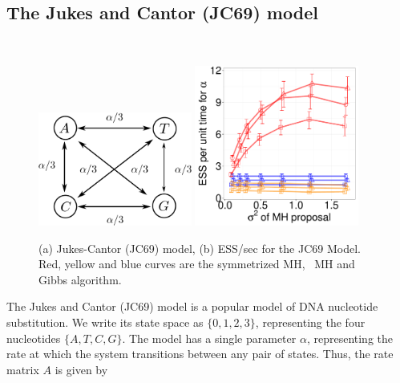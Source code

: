 {\vspace{-.23in}
  \subsection{The Jukes and Cantor (JC69) model}~
  \begin{figure}%
  \begin{minipage}[!hp]{0.75\linewidth}
    \includegraphics[width=0.45\textwidth, angle=0]{figs/jc_model.pdf}
    \includegraphics[width=0.48\textwidth, angle=0]{figs/jc.pdf}
  \end{minipage}
  \begin{minipage}[!hp]{0.23\linewidth}
  \caption{(a) Jukes-Cantor (JC69) model, (b)
    ESS/sec for the JC69 Model. Red, yellow and blue curves are the 
      symmetrized MH, \naive\ MH and Gibbs algorithm. }
     \label{fig:ESS_JC}
  \end{minipage}
\vspace{-.2in}
  \end{figure}
  The Jukes and Cantor (JC69) model is a popular model of DNA nucleotide
  substitution.  We write its state space as $\{0, 1, 2, 3\}$, representing the 
  four nucleotides $\{A, T, C, G\}$.  The model has a single parameter $\alpha$, 
  representing the rate at which the system transitions between any pair of 
  states. Thus, the rate matrix $A$ is given by 
}
